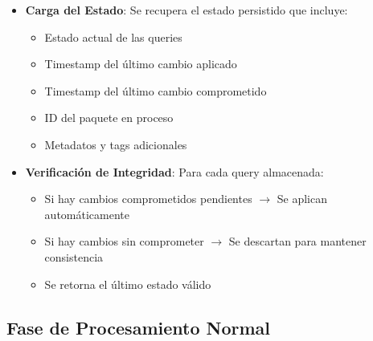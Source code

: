 \begin{itemize}
  \item \textbf{Carga del Estado}: Se recupera el estado persistido que incluye:
    \begin{itemize}
      \item Estado actual de las queries
      \item Timestamp del último cambio aplicado
      \item Timestamp del último cambio comprometido
      \item ID del paquete en proceso
      \item Metadatos y tags adicionales
    \end{itemize}

  \item \textbf{Verificación de Integridad}: Para cada query almacenada:
    \begin{itemize}
      \item Si hay cambios comprometidos pendientes $\rightarrow$ Se aplican automáticamente
      \item Si hay cambios sin comprometer $\rightarrow$ Se descartan para mantener consistencia
      \item Se retorna el último estado válido
    \end{itemize}
\end{itemize}


\subsection*{Fase de Procesamiento Normal}

